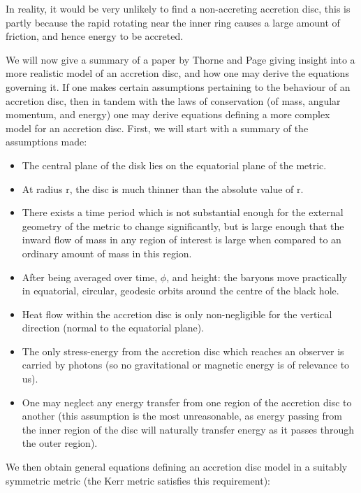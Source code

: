 \documentclass[oneside,openright,frontopenright, singlespacing]{dmathesis}
\begin{document}
\vspace{1em}
	In reality, it would be very unlikely to find a non-accreting accretion disc, this is partly because the rapid rotating near the inner ring causes a large amount of friction, and hence energy to be accreted.

\vspace{1em}
	We will now give a summary of a paper by Thorne and Page\cite{page1974disk} giving insight into a more realistic model of an accretion disc, and how one may derive the equations governing it. If one makes certain assumptions pertaining to the behaviour of an accretion disc, then in tandem with the laws of conservation (of mass, angular momentum, and energy) one may derive equations defining a more complex model for an accretion disc. First, we will start with a summary of the assumptions made:

\vspace{1em}
\begin{itemize}
	\item The central plane of the disk lies on the equatorial plane of the metric.
	\item At radius r, the disc is much thinner than the absolute value of r.
	\item There exists a time period which is not substantial enough for the external geometry of the metric to change significantly, but is large enough that the inward flow of mass in any region of interest is large when compared to an ordinary amount of mass in this region.
	\item After being averaged over time, $\phi$, and height: the baryons move practically in equatorial, circular, geodesic orbits around the centre of the black hole.
	\item Heat flow within the accretion disc is only non-negligible for the vertical direction (normal to the equatorial plane).
	\item The only stress-energy from the accretion disc which reaches an observer is carried by photons (so no gravitational or magnetic energy is of relevance to us).
	\item One may neglect any energy transfer from one region of the accretion disc to another (this assumption is the most unreasonable, as energy passing from the inner region of the disc will naturally transfer energy as it passes through the outer region).
\end{itemize}

\vspace{1em}
	We then obtain general equations defining an accretion disc model in a suitably symmetric metric (the Kerr metric satisfies this requirement):
\end{document}
